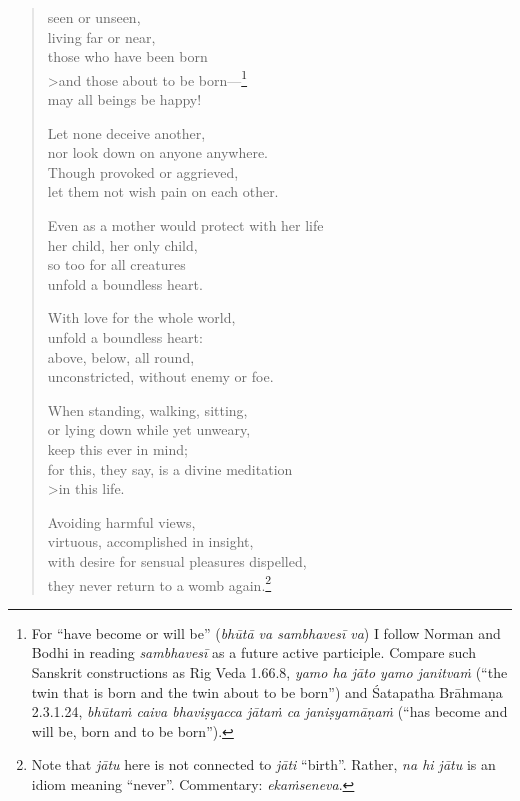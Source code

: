 \documentclass[12pt,openany]{book}%
\begin{document}
\begin{verse}
seen or unseen, \\
living far or near, \\
those who have been born \\>and those about to be born—\footnote{For “have become or will be” (\textit{\textsanskrit{bhūtā} va \textsanskrit{sambhavesī} va}) I follow Norman and Bodhi in reading \textit{\textsanskrit{sambhavesī}} as a future active participle. Compare such Sanskrit constructions as Rig Veda 1.66.8, \textit{yamo ha \textsanskrit{jāto} yamo \textsanskrit{janitvaṁ}} (“the twin that is born and the twin about to be born”) and Śatapatha \textsanskrit{Brāhmaṇa} 2.3.1.24, \textit{\textsanskrit{bhūtaṁ} caiva \textsanskrit{bhaviṣyacca} \textsanskrit{jātaṁ} ca \textsanskrit{janiṣyamāṇaṁ}} (“has become and will be, born and to be born”). } \\
may all beings be happy! 

Let none deceive another, \\
nor look down on anyone anywhere. \\
Though provoked or aggrieved, \\
let them not wish pain on each other. 

Even as a mother would protect with her life \\
her child, her only child, \\
so too for all creatures \\
unfold a boundless heart. 

With love for the whole world, \\
unfold a boundless heart: \\
above, below, all round, \\
unconstricted, without enemy or foe. 

When standing, walking, sitting, \\
or lying down while yet unweary, \\
keep this ever in mind; \\
for this, they say, is a divine meditation \\>in this life. 

Avoiding harmful views, \\
virtuous, accomplished in insight, \\
with desire for sensual pleasures dispelled, \\
they never return to a womb again.\footnote{Note that \textit{\textsanskrit{jātu}} here is not connected to \textit{\textsanskrit{jāti}} “birth”. Rather, \textit{na hi \textsanskrit{jātu}} is an idiom meaning “never”. Commentary: \textit{\textsanskrit{ekaṁseneva}}. } 

%
\end{verse}
\end{document}

